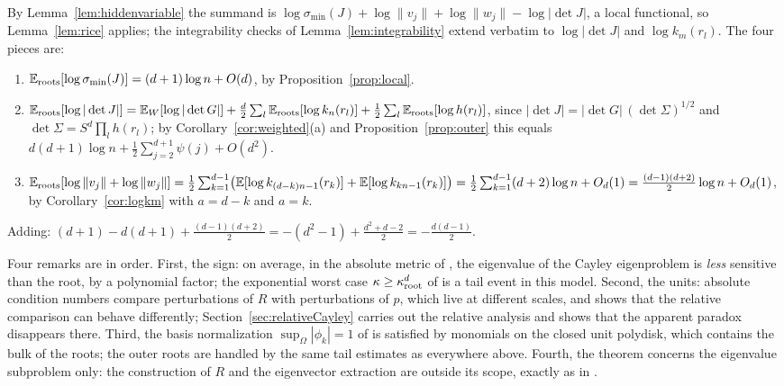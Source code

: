 \proof
By Lemma~\ref{lem:hiddenvariable} the summand is
$\log\sigma_{\min}(J) + \log\|v_j\| + \log\|w_j\| - \log|\det J|$, a local functional, so
Lemma~\ref{lem:rice} applies; the integrability checks of Lemma~\ref{lem:integrability}
extend verbatim to $\log|\det J|$ and $\log k_m(r_l)$. The four pieces are:
\begin{enumerate}[(1)]
  \item $\mathbb{E}_{\mathrm{roots}}[\log\sigma_{\min}(J)] = (d+1)\log n + O(d)$, by
    Proposition~\ref{prop:local}.
  \item $\mathbb{E}_{\mathrm{roots}}[\log|\det J|] = \mathbb{E}_{W}[\log|\det G|]
    + \frac d2\sum_l\mathbb{E}_{\mathrm{roots}}[\log k_n(r_l)] + \frac12\sum_l\mathbb{E}_{\mathrm{roots}}[\log h(r_l)]$, since
    $|\det J| = |\det G|\,(\det\Sigma)^{1/2}$ and $\det\Sigma = S^d\prod_lh(r_l)$; by
    Corollary~\ref{cor:weighted}(a) and Proposition~\ref{prop:outer} this equals
    $d(d+1)\log n + \frac12\sum_{j=2}^{d+1}\psi(j) + O(d^2)$.
  \item $\mathbb{E}_{\mathrm{roots}}[\log\|v_j\| + \log\|w_j\|]
    = \frac12\sum_{k=1}^{d-1}\bigl(\mathbb{E}[\log k_{(d-k)n-1}(r_k)]
    + \mathbb{E}[\log k_{kn-1}(r_k)]\bigr)
    = \frac12\sum_{k=1}^{d-1}(d+2)\log n + O_d(1)
    = \frac{(d-1)(d+2)}2\log n + O_d(1)$, by Corollary~\ref{cor:logkm} with $a=d-k$ and
    $a=k$.
\end{enumerate}
Adding: $(d+1) - d(d+1) + \frac{(d-1)(d+2)}2 = -(d^2-1) + \frac{d^2+d-2}2
= -\frac{d(d-1)}2$.
\endproof

\begin{remark}\label{rem:cayley}
  Four remarks are in order. First, the sign: on average, in the absolute metric of
  \cite{noferini2016numerical}, the eigenvalue of the Cayley eigenproblem is \emph{less}
  sensitive than the root, by a polynomial factor; the exponential worst case
  $\kappa\ge\kappa_{\mathrm{root}}^d$ of \cite[Thm.~3.7]{noferini2016numerical} is a tail event in this
  model. Second, the units: absolute condition numbers compare perturbations of $R$ with
  perturbations of $p$, which live at different scales, and
  \cite[Sec.~5]{noferini2016numerical} shows that the relative comparison can behave
  differently; Section~\ref{sec:relativeCayley} carries out the relative analysis and shows
  that the apparent paradox disappears there. Third, the basis normalization
  $\sup_\Omega|\phi_k| = 1$ of \cite{noferini2016numerical} is satisfied by monomials on
  the closed unit polydisk, which contains the bulk of the roots; the outer roots are
  handled by the same tail estimates as everywhere above. Fourth, the theorem concerns the
  eigenvalue subproblem only: the construction of $R$ and the eigenvector extraction are
  outside its scope, exactly as in
  \cite{noferini2016numerical,graf2026numerical}.
\end{remark}

